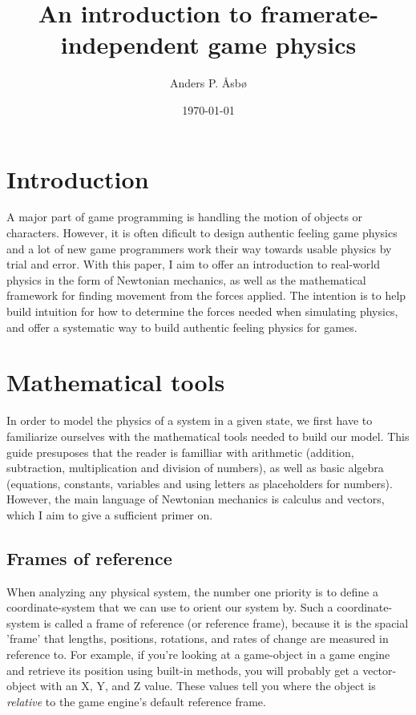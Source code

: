 \documentclass[%
notitlepage,
 amsmath,amssymb,
 aps,
]{revtex4-2}  %
\begin{document}
\title{An introduction to framerate-independent game physics}   %
\author{Anders P. Åsbø}               %
\date{\today}                             %
\noaffiliation                            %

\maketitle                                %
\tableofcontents
\newpage

\section{Introduction} \label{sec:Intro}
A major part of game programming is handling the motion of objects or characters. However, it is often dificult to design authentic feeling game physics and a lot of new game programmers work their way towards usable physics by trial and error. With this paper, I aim to offer an introduction to real-world physics in the form of Newtonian mechanics, as well as the mathematical framework for finding movement from the forces applied. The intention is to help build intuition for how to determine the forces needed when simulating physics, and offer a systematic way to build authentic feeling physics for games.

\section{Mathematical tools} \label{sec:Maths}
In order to model the physics of a system in a given state, we first have to familiarize ourselves with the mathematical tools needed to build our model. This guide presuposes that the reader is familliar with arithmetic (addition, subtraction, multiplication and division of numbers), as well as basic algebra (equations, constants, variables and using letters as placeholders for numbers). However, the main language of Newtonian mechanics is calculus and vectors, which I aim to give a sufficient primer on.

\subsection{Frames of reference} \label{sec:Maths:subsec:FrameOfReference}
When analyzing any physical system, the number one priority is to define a coordinate-system that we can use to orient our system by. Such a coordinate-system is called a frame of reference (or reference frame), because it is the spacial 'frame' that lengths, positions, rotations, and rates of change are measured in reference to. For example, if you're looking at a game-object in a game engine and retrieve its position using built-in methods, you will probably get a vector-object with an X, Y, and Z value. These values tell you where the object is \textit{relative} to the game engine's default reference frame.
\end{document}
